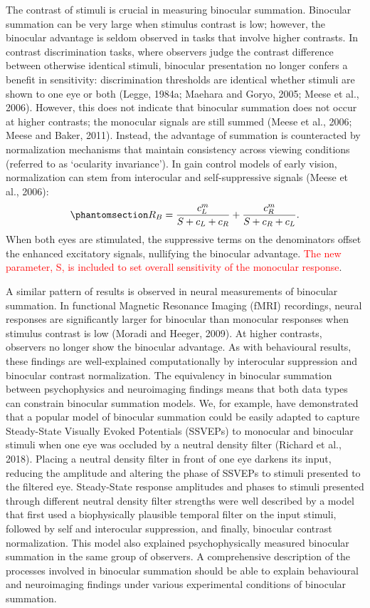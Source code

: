 \documentclass[
  12pt,
]{article}
\begin{document}
The contrast of stimuli is crucial in measuring binocular summation.
Binocular summation can be very large when stimulus contrast is low;
however, the binocular advantage is seldom observed in tasks that
involve higher contrasts. In contrast discrimination tasks, where
observers judge the contrast difference between otherwise identical
stimuli, binocular presentation no longer confers a benefit in
sensitivity: discrimination thresholds are identical whether stimuli are
shown to one eye or both (Legge, 1984a; Maehara and Goryo, 2005; Meese
et al., 2006). However, this does not indicate that binocular summation
does not occur at higher contrasts; the monocular signals are still
summed (Meese et al., 2006; Meese and Baker, 2011). Instead, the
advantage of summation is counteracted by normalization mechanisms that
maintain consistency across viewing conditions (referred to as
`ocularity invariance'). In gain control models of early vision,
normalization can stem from interocular and self-suppressive signals
(Meese et al., 2006):
\begin{equation}\phantomsection\label{eq-intoMath2}{
R_B = \frac{c_L^m}{S+c_L+c_R} + \frac{c_R^m}{S+c_R+c_L}.
}\end{equation} When both eyes are stimulated, the suppressive terms on
the denominators offset the enhanced excitatory signals, nullifying the
binocular advantage. \textcolor{red}{The new parameter, S, is included to set
overall sensitivity of the monocular response}.

A similar pattern of results is observed in neural measurements of
binocular summation. In functional Magnetic Resonance Imaging (fMRI)
recordings, neural responses are significantly larger for binocular than
monocular responses when stimulus contrast is low (Moradi and Heeger,
2009). At higher contrasts, observers no longer show the binocular
advantage. As with behavioural results, these findings are
well-explained computationally by interocular suppression and binocular
contrast normalization. The equivalency in binocular summation between
psychophysics and neuroimaging findings means that both data types can
constrain binocular summation models. We, for example, have demonstrated
that a popular model of binocular summation could be easily adapted to
capture Steady-State Visually Evoked Potentials (SSVEPs) to monocular
and binocular stimuli when one eye was occluded by a neutral density
filter (Richard et al., 2018). Placing a neutral density filter in front
of one eye darkens its input, reducing the amplitude and altering the
phase of SSVEPs to stimuli presented to the filtered eye. Steady-State
response amplitudes and phases to stimuli presented through different
neutral density filter strengths were well described by a model that
first used a biophysically plausible temporal filter on the input
stimuli, followed by self and interocular suppression, and finally,
binocular contrast normalization. This model also explained
psychophysically measured binocular summation in the same group of
observers. A comprehensive description of the processes involved in
binocular summation should be able to explain behavioural and
neuroimaging findings under various experimental conditions of binocular
summation.
\end{document}

